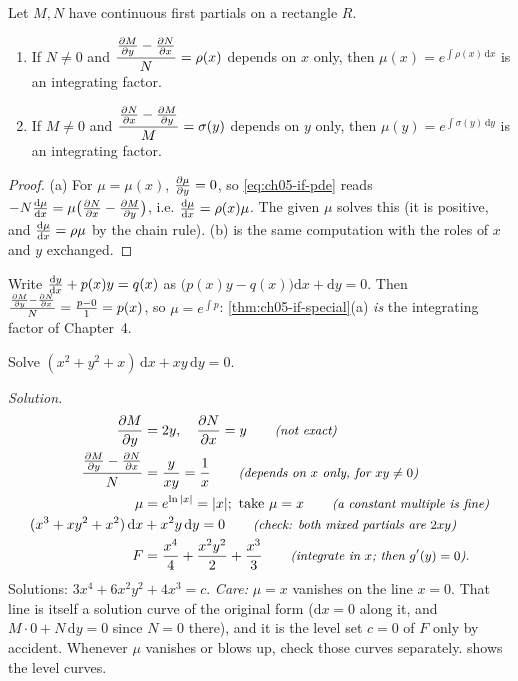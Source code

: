\begin{theorem}\label{thm:ch05-if-special}
Let $M,N$ have continuous first partials on a rectangle $R$.
\begin{enumerate}[label=(\alph*)]
  \item If $N\neq 0$ and $\dfrac{\frac{\partial M}{\partial y} - \frac{\partial N}{\partial x}}{N} = \rho(x)$ depends
        on $x$ only, then $\mu(x) = e^{\int\rho(x)\,\mathrm{d}x}$ is an integrating
        factor.
  \item If $M\neq0$ and $\dfrac{\frac{\partial N}{\partial x} - \frac{\partial M}{\partial y}}{M} = \sigma(y)$ depends
        on $y$ only, then $\mu(y) = e^{\int\sigma(y)\,\mathrm{d}y}$ is an integrating
        factor.
\end{enumerate}
\end{theorem}
\begin{proof}
(a) For $\mu = \mu(x)$, $\frac{\partial \mu}{\partial y} = 0$, so \eqref{eq:ch05-if-pde} reads
$-N\frac{\mathrm{d}\mu}{\mathrm{d}x} = \mu\bigl(\frac{\partial N}{\partial x} - \frac{\partial M}{\partial y}\bigr)$, i.e.
$\frac{\mathrm{d}\mu}{\mathrm{d}x} = \rho(x)\mu$. The given $\mu$ solves this (it is positive, and
$\frac{\mathrm{d}\mu}{\mathrm{d}x} = \rho\mu$ by the chain rule). (b) is the same computation with
the roles of $x$ and $y$ exchanged.
\end{proof}

\begin{example}\label{ex:ch05-linear}
Write $\frac{\mathrm{d}y}{\mathrm{d}x} + p(x)y = q(x)$ as $\bigl(p(x)y - q(x)\bigr)\mathrm{d}x + \mathrm{d}y = 0$.
Then $\frac{\frac{\partial M}{\partial y} - \frac{\partial N}{\partial x}}{N} = \frac{p - 0}{1} = p(x)$, so
$\mu = e^{\int p}$: \cref{thm:ch05-if-special}(a) \emph{is} the integrating
factor of Chapter~4.
\end{example}

\begin{example}\label{ex:ch05-mu-x}
Solve $(x^2 + y^2 + x)\,\mathrm{d}x + xy\,\mathrm{d}y = 0$.

\emph{Solution.}
\begin{align*}
  \frac{\partial M}{\partial y} &= 2y,\quad \frac{\partial N}{\partial x} = y \qquad\text{\small\itshape(not exact)}\\
  \frac{\frac{\partial M}{\partial y} - \frac{\partial N}{\partial x}}{N} &= \frac{y}{xy} = \frac1x
     \qquad\text{\small\itshape(depends on $x$ only, for $xy\neq 0$)}\\
  \mu &= e^{\ln|x|} = |x|;\ \text{take } \mu = x \qquad\text{\small\itshape(a constant multiple is fine)}\\
  (x^3 + xy^2 + x^2)\,\mathrm{d}x &+ x^2y\,\mathrm{d}y = 0
     \qquad\text{\small\itshape(check: both mixed partials are $2xy$)}\\
  F &= \frac{x^4}{4} + \frac{x^2y^2}{2} + \frac{x^3}{3}
     \qquad\text{\small\itshape(integrate in $x$; then $g'(y) = 0$)}.
\end{align*}
Solutions: $3x^4 + 6x^2y^2 + 4x^3 = c$. \emph{Care:} $\mu = x$ vanishes on the
line $x = 0$. That line is itself a solution curve of the original form
($\mathrm{d}x = 0$ along it, and $M\cdot 0 + N\,\mathrm{d}y = 0$ since $N = 0$
there), and it is the level set $c = 0$ of $F$ only by accident. Whenever $\mu$
vanishes or blows up, check those curves separately.
 shows the level curves.
\end{example}

